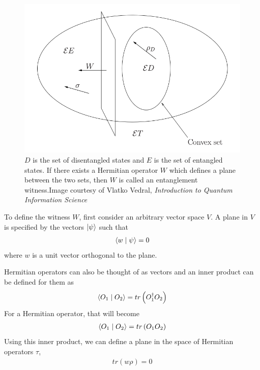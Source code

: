 \begin{figure}
  \begin{center}
    \includegraphics[scale=0.52]{figures/entanglementwitness.png}
    \caption{$D$ is the set of disentangled states and $E$ is the set of entangled states. If there exists a Hermitian operator $W$ which defines a plane between the two sets, then $W$ is called an entanglement witness.\newline Image courtesy of Vlatko Vedral, \textit{Introduction to Quantum Information Science} \cite{vedralqitbook}}
    \label{fig: Entanglement Witnesses}
  \end{center}
\end{figure}
\par To define the witness $W$, first consider an arbitrary vector space $V$. A plane in $V$ is specified by the vectors $\ket{\psi}$ such that
\begin{align*}
\braket{w \mid \psi} = 0
\end{align*}
where $w$ is a unit vector orthogonal to the plane.
\par Hermitian operators can also be thought of as vectors and an inner product can be defined for them as
\begin{align*}
\braket{O_1 \mid O_2} = tr \left( O_1^{\dagger} O_2 \right)
\end{align*}
For a Hermitian operator, that will become
\begin{align*}
\braket{O_1 \mid O_2} = tr \left( O_1 O_2 \right)
\end{align*}
Using this inner product, we can define a plane in the space of Hermitian operators $\tau$,
\begin{align*}
tr ( w \rho ) = 0
\end{align*}
